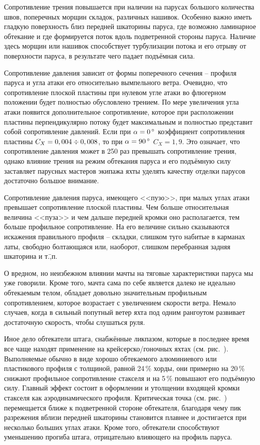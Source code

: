 Сопротивление трения повышается при наличии на парусах большого
количества швов, поперечных морщин складок, различных
нашивок. Особенно важно иметь гладкую поверхность близ передней
шкаторины паруса, где возможно ламинарное обтекание и где формируется
поток вдоль подветренной стороны паруса. Наличие здесь морщин или
нашивок способствует турбулизации потока и его отрыву от поверхности
паруса, в результате чего падает подъёмная сила.

Сопротивление давления зависит от формы поперечного сечения \---
профиля паруса и угла атаки его относительно вымпельного
ветра. Очевидно, что сопротивление плоской пластины при нулевом угле
атаки во флюгерном положении будет полностью обусловлено трением. По
мере увеличения угла атаки появится дополнительное сопротивление,
которое при расположении пластины перпендикулярно потоку будет
максимальным и полностью представит собой сопротивление давлений. Если
при $\alpha = 0\,^\circ$ коэффициент сопротивления пластины
$C_X = 0,004\div 0,008$, то при $\alpha = 90\,^\circ$ $C_X = 1,9$. Это
означает, что сопротивление давления может в 250 раз
превышать сопротивление трения, однако влияние трения на режим
обтекания паруса и его подъёмную силу заставляет парусных мастеров
экипажа яхты уделять качеству отделки парусов достаточно большое
внимание.

Сопротивление давления паруса, имеющего <<пузо>>, при малых углах
атаки превышает сопротивление плоской пластины. Чем больше
относительная величина <<пуза>> и чем дальше передней кромки оно
располагается, тем больше профильное сопротивление. На его величине
сильно сказываются искажения правильного профиля \--- складки, слишком
туго набитые в карманах латы, свободно болтающаяся или, наоборот,
слишком перебранная задняя шкаторина и т.\=,п.
 
О вредном, но неизбежном влиянии мачты на тяговые характеристики
паруса мы уже говорили. Кроме того, мачта сама по себе является далеко
не идеально обтекаемым телом, обладает довольно значительным
профильным сопротивлением, которое возрастает с увеличением скорости
ветра. Немало случаев, когда в сильный попутный ветер яхта под одним
рангоутом развивает достаточную скорость, чтобы слушаться руля.

Иное дело обтекатели штага, снабжённые ликпазом, которые в последнее
время все чаще находят применение на крейсерско\-/гоночных яхтах
(см. рис.~). Выполняемые обычно в виде хорошо обтекаемого
алюминиевого или пластикового профиля с толщиной, равной 24\,\% хорды, они примерно на 20\,\% снижают профильное сопротивление
стакселя и на 5\,\% повышают его подъёмную силу. Главный эффект
состоит в оформлении и утолщении входящей кромки стакселя как
аэродинамического профиля. Критическая точка (см. рис.~)
перемещается ближе к подветренной стороне обтекателя, благодаря чему
пик разрежения вблизи передней шкаторины становится плавнее и
достигается при несколько больших углах атаки. Кроме того, обтекатели
способствуют уменьшению прогиба штага, отрицательно влияющего на
профиль паруса.

